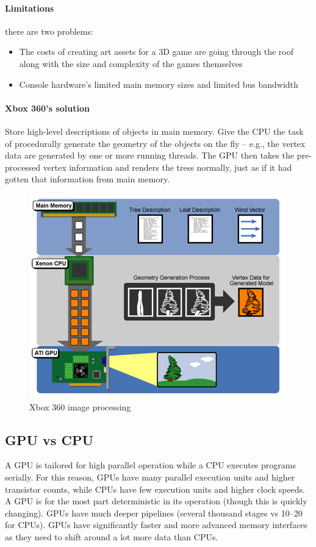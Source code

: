 \paragraph{Limitations} there are two problems:
\begin{itemize}
    \item The costs of creating art assets for a 3D game are
going through the roof along with the size and
complexity of the games themselves
    \item Console hardware's limited main memory sizes and
limited bus bandwidth
\end{itemize}

\paragraph{Xbox 360's solution}
Store high-level descriptions of objects in main memory.
Give the CPU the task of procedurally generate the geometry of the objects on the fly -- e.g., the vertex data are
generated by one or more running threads.
The GPU then takes the pre-processed vertex information and renders the tress normally, just as if it had gotten that
information from main memory.

\begin{figure}[h]
    \centering
    \includegraphics[width=\linewidth]{images/xbox-360-image-processing}
    \caption{Xbox 360 image processing}
    \label{fig:xbox-360-image-processing}
\end{figure}

\subsection{GPU vs CPU}\label{subsec:gpu-vs-cpu}
A GPU is tailored for high parallel operation while a
CPU executes programs serially.
For this reason, GPUs have many parallel execution
units and higher transistor counts, while CPUs have few
execution units and higher clock speeds.
A GPU is for the most part deterministic in its operation
(though this is quickly changing).
GPUs have much deeper pipelines (several thousand
stages vs 10--20 for CPUs).
GPUs have significantly faster and more advanced
memory interfaces as they need to shift around a lot
more data than CPUs.

